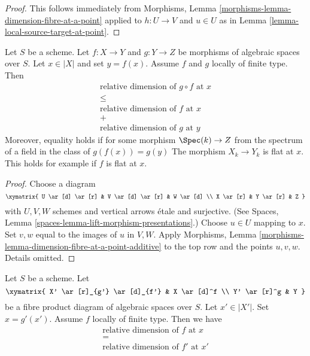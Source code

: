 \begin{proof}
This follows immediately from
Morphisms, Lemma \ref{morphisms-lemma-dimension-fibre-at-a-point}
applied to $h : U \to V$ and $u \in U$
as in
Lemma \ref{lemma-local-source-target-at-point}.
\end{proof}

\begin{lemma}
\label{lemma-dimension-fibre-at-a-point-additive}
Let $S$ be a scheme.
Let $f : X \to Y$ and $g : Y \to Z$ be morphisms of algebraic spaces over $S$.
Let $x \in |X|$ and set $y = f(x)$.
Assume $f$ and $g$ locally of finite type.
Then
$$
\begin{matrix}
\text{relative dimension of }g \circ f\text{ at }x \\
\leq \\
\text{relative dimension of }f\text{ at }x \\
+ \\
\text{relative dimension of }g\text{ at }y
\end{matrix}
$$
Moreover, equality holds if for some morphism $\Spec(k) \to Z$
from the spectrum of a field in the class of $g(f(x)) = g(y)$
The morphism $X_k \to Y_k$ is flat at $x$.
This holds for example if $f$ is flat at $x$.
\end{lemma}

\begin{proof}
Choose a diagram
$$
\xymatrix{
U \ar[d] \ar[r] & V \ar[d] \ar[r] & W \ar[d] \\
X \ar[r] & Y \ar[r] & Z
}
$$
with $U, V, W$ schemes and vertical arrows \'etale and surjective. (See
Spaces, Lemma \ref{spaces-lemma-lift-morphism-presentations}.)
Choose $u \in U$ mapping to $x$. Set $v, w$ equal to the images
of $u$ in $V, W$.
Apply
Morphisms, Lemma \ref{morphisms-lemma-dimension-fibre-at-a-point-additive}
to the top row and the points $u, v, w$. Details omitted.
\end{proof}

\begin{lemma}
\label{lemma-dimension-fibre-after-base-change}
Let $S$ be a scheme. Let
$$
\xymatrix{
X' \ar[r]_{g'} \ar[d]_{f'} & X \ar[d]^f \\
Y' \ar[r]^g & Y
}
$$
be a fibre product diagram of algebraic spaces over $S$.
Let $x' \in |X'|$. Set $x = g'(x')$.
Assume $f$ locally of finite type.
Then we have
$$
\begin{matrix}
\text{relative dimension of }f\text{ at }x \\
= \\
\text{relative dimension of }f'\text{ at }x'
\end{matrix}
$$
\end{lemma}

